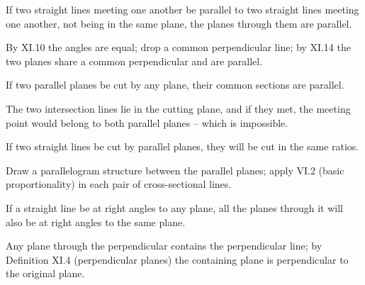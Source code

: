 \begin{claim}
\label{prop:XI.15}
If two straight lines meeting one another be parallel to two straight
lines meeting one another, not being in the same plane, the planes
through them are parallel.
\end{claim}
\begin{evidence}[Proof of XI.15]
\label{ev:XI.15}
By XI.10 the angles are equal; drop a common perpendicular line; by
XI.14 the two planes share a common perpendicular and are parallel.
\end{evidence}

\begin{claim}
\label{prop:XI.16}
If two parallel planes be cut by any plane, their common sections
are parallel.
\end{claim}
\begin{evidence}[Proof of XI.16]
\label{ev:XI.16}
The two intersection lines lie in the cutting plane, and if they
met, the meeting point would belong to both parallel planes -- which
is impossible.
\end{evidence}

\begin{claim}
\label{prop:XI.17}
If two straight lines be cut by parallel planes, they will be cut in
the same ratios.
\end{claim}
\begin{evidence}[Proof of XI.17]
\label{ev:XI.17}
Draw a parallelogram structure between the parallel planes; apply
VI.2 (basic proportionality) in each pair of cross-sectional lines.
\end{evidence}

\begin{claim}
\label{prop:XI.18}
If a straight line be at right angles to any plane, all the planes
through it will also be at right angles to the same plane.
\end{claim}
\begin{evidence}[Proof of XI.18]
\label{ev:XI.18}
Any plane through the perpendicular contains the perpendicular line;
by Definition XI.4 (perpendicular planes) the containing plane is
perpendicular to the original plane.
\end{evidence}

